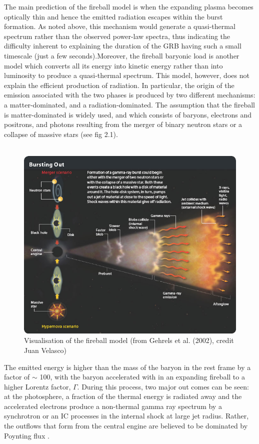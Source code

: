  The main prediction of the fireball model is when the expanding plasma becomes optically thin and hence the emitted radiation escapes within the burst formation.
As noted above, this mechanism would generate a quasi-thermal spectrum rather than the observed power-law spectra, thus indicating the difficulty inherent to explaining the duration of the GRB having such a small timescale (just a few seconds).Moreover, the fireball baryonic load is another model which converts all its energy into kinetic energy rather than into luminosity to produce a quasi-thermal spectrum. This model, however, does not explain the efficient production of radiation. In particular, the origin of the emission associated with the two phases is produced by two different mechanisms: a matter-dominated, and a radiation-dominated. The  assumption  that  the  fireball is  matter-dominated  is  widely  used, and which consists of baryons, electrons and positrons, and  photons  resulting from  the merger of binary  neutron stars or a collapse of massive stars \citep{10} \citep{15} (see fig 2.1). \\\\ 
\begin{figure}[h]
\begin{center}
\includegraphics[scale=0.5]{Figures/fig5.png}
\caption{Visualisation of the fireball model (from Gehrels et al. (2002), credit
Juan Velasco)\citep{13}}
\end{center}
\end{figure} 
The  emitted  energy  is  higher than  the  mass of  the baryon in the rest frame by a factor of  $\sim $ 100, with  the  baryon  accelerated  with in an expanding fireball to a higher Lorentz factor, $\Gamma $. During this process, two major out comes can be seen: at the photosphere, a fraction of the thermal energy is radiated away  and  the  accelerated  electrons  produce  a non-thermal  gamma ray spectrum by a synchrotron  or an IC  processes in the  internal shock at large jet radius. Rather, the outflows that form from the central engine are believed to be dominated by Poynting flux \citep{15}\citep{16}.\\\\


